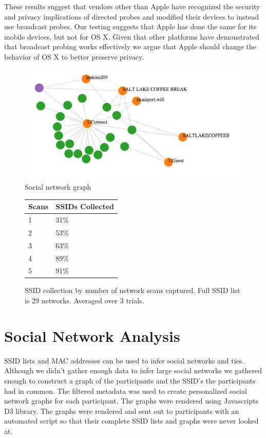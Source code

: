 \documentclass[letterpaper,twocolumn,10pt]{article}
\begin{document}
These results suggest that vendors other than Apple have recognized the security and privacy implications of directed probes and modified their devices to instead use broadcast probes. Our testing suggests that Apple has done the same for its mobile devices, but not for OS X. Given that other platforms have demonstrated that broadcast probing works effectively we argue that Apple should change the behavior of OS X to better preserve privacy.
\begin{figure}
\centering
\includegraphics[scale=.5]{graph.png}
\caption{\textsf{Social network graph}}
\end{figure}
\begin{figure}
\centering
\begin{tabular}{l | l}
Scans & SSIDs Collected \\ 
\hline
1 & 31\% \\
2 & 53\% \\
3 & 63\% \\
4 & 89\% \\
5 & 91\% \\
\end{tabular}
\caption{SSID collection by number of network scans captured. Full SSID list is 29 networks. Averaged over 3 trials.}
\label{fig:scan}
\end{figure}


\section{Social Network Analysis}
\label{sec:social}
SSID lists and MAC addresses can be used to infer social networks and ties\cite{cheng}. Although we didn't gather enough data to infer large social networks we gathered enough to construct a graph of the participants and the SSID's the participants had in common. The filtered metadata was used to create personalized social network graphs for each participant. The graphs were rendered using Javascripts D3 library. The graphs were rendered and sent out to participants with an automated script so that their complete SSID lists and graphs were never looked at. 
\end{document}
